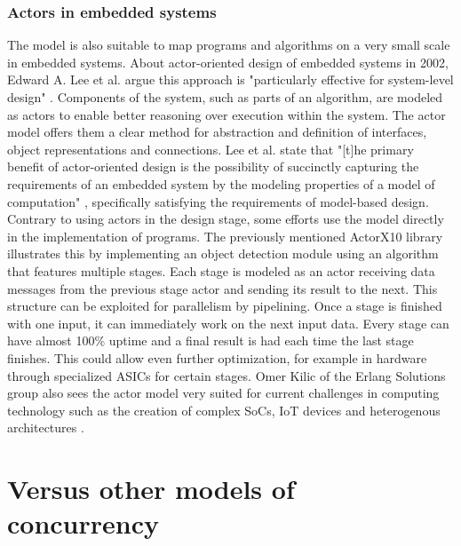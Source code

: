 \documentclass[A4]{article}
\begin{document}
\subsubsection{Actors in embedded systems}
The model is also suitable to map programs and algorithms on a very small scale in embedded systems. About actor-oriented design of embedded systems in 2002, Edward A. Lee et al. argue this approach is "particularly effective for system-level design" \cite[p.~12]{Lee03actor-orienteddesign}. Components of the system, such as parts of an algorithm, are modeled as actors to enable better reasoning over execution within the system. The actor model offers them a clear method for abstraction and definition of interfaces, object representations and connections. Lee et al. state that "[t]he primary benefit of actor-oriented design is the possibility of succinctly capturing the requirements of an embedded system by the modeling properties of a model of computation" \cite[p.~23]{Lee03actor-orienteddesign}, specifically satisfying  the requirements of model-based design. 
Contrary to using actors in the design stage, some efforts use the model directly in the implementation of programs. The previously mentioned ActorX10 library illustrates this by implementing an object detection module using an algorithm that features multiple stages. Each stage is modeled as an actor receiving data messages from the previous stage actor and sending its result to the next. This structure can be exploited for parallelism by pipelining. Once a stage is finished with one input, it can immediately work on the next input data. Every stage can have almost 100\% uptime and a final result is had each time the last stage finishes. \cite[p.~4]{Roloff:2016:AAL:2931028.2931033} This could allow even further optimization, for example in hardware through specialized ASICs for certain stages. 
Omer Kilic of the Erlang Solutions group also sees the actor model very suited for current challenges in computing technology such as the creation of complex SoCs, IoT devices and heterogenous architectures \cite[p.~5]{ErlangKilic}.

\section{Versus other models of concurrency}
\end{document}
